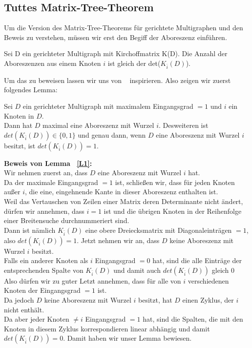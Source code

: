 \subsection{Tuttes Matrix-Tree-Theorem}
Um die Version des Matrix-Tree-Theorems für gerichtete Multigraphen und den Beweis zu verstehen, müssen wir erst den Begiff der Aboreszenz einführen.
\begin{Tms}
Sei D ein gerichteter Multigraph mit Kirchoffmatrix K(D). Die Anzahl der Aboreszenzen aus einem Knoten $i$ ist gleich der det($K_{\bar{i}}(D)$).
\end{Tms}
Um das zu beweisen lassen wir uns von ~\cite{bang-jensen_2009} inspirieren.
Also zeigen wir zuerst folgendes Lemma:
\begin{Lms}
Sei $D$ ein gerichteter Multigraph mit maximalem Eingangsgrad $=1$ und $i$ ein Knoten in $D$.\\
Dann hat $D$ maximal eine Aboreszenz mit Wurzel $i$. Desweiteren ist $det(K_{\bar{i}}(D)) \in \{0,1\}$
und genau dann, wenn $D$ eine Aboreszenz mit Wurzel $i$ besitzt, ist $det(K_{\bar{i}}(D)) = 1$.
\label{L1}
\end{Lms}
\textbf{Beweis von Lemma ~\ref{L1}:}\\
Wir nehmen zuerst an, dass $D$ eine Aboreszenz mit Wurzel $i$ hat.\\
Da der maximale Eingangsgrad $=1$ ist, schließen wir, dass für jeden Knoten außer $i$, die eine, eingehnende Kante in dieser Aboreszenz enthalten ist. \\
Weil das Vertauschen von Zeilen einer Matrix deren Determinante nicht ändert, dürfen wir annehmen, dass $i=1$ ist und die übrigen Knoten in der Reihenfolge einer Breitensuche durchnummeriert sind.\\ 
Dann ist nämlich $K_{\bar{i}}(D)$ eine obere Dreiecksmatrix mit Diagonaleinträgen $=1$, also $det(K_{\bar{i}}(D)) = 1$.
Jetzt nehmen wir an, dass $D$ keine Aboreszenz mit Wurzel $i$ besitzt.\\
Falls ein anderer Knoten als $i$ Eingangsgrad $=0$ hat, sind die alle Einträge der entsprechenden Spalte von $K_{\bar{i}}(D)$ und damit auch $det(K_{\bar{i}}(D))$ gleich $0$\\
Also dürfen wir zu guter Letzt annehmen, dass für alle von $i$ verschiedenen Knoten der Eingangsgrad $=1$ ist.\\
Da jedoch $D$ keine Aboreszenz mit Wurzel $i$ besitzt, hat $D$ einen Zyklus, der $i$ nicht enthält.\\
Da aber jeder Knoten $\neq i$ Eingangsgrad $=1$ hat, sind die Spalten, die mit den Knoten in diesem Zyklus korrespondieren linear abhängig und damit $det(K_{\bar{i}}(D)) = 0$.
Damit haben wir unser Lemma bewiesen.

